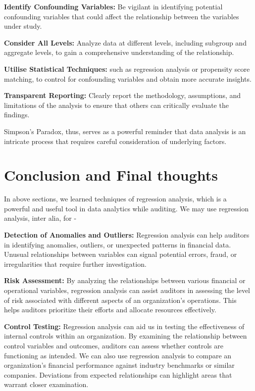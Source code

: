 \documentclass[
]{book}
\begin{document}
\textbf{Identify Confounding Variables:} Be vigilant in identifying potential confounding variables that could affect the relationship between the variables under study.

\textbf{Consider All Levels:} Analyze data at different levels, including subgroup and aggregate levels, to gain a comprehensive understanding of the relationship.

\textbf{Utilise Statistical Techniques:} such as regression analysis or propensity score matching, to control for confounding variables and obtain more accurate insights.

\textbf{Transparent Reporting:} Clearly report the methodology, assumptions, and limitations of the analysis to ensure that others can critically evaluate the findings.

Simpson's Paradox, thus, serves as a powerful reminder that data analysis is an intricate process that requires careful consideration of underlying factors.

\hypertarget{conclusion-and-final-thoughts}{%
\section{Conclusion and Final thoughts}\label{conclusion-and-final-thoughts}}

In above sections, we learned techniques of regression analysis, which is a powerful and useful tool in data analytics while auditing. We may use regression analysis, inter alia, for -

\textbf{Detection of Anomalies and Outliers:} Regression analysis can help auditors in identifying anomalies, outliers, or unexpected patterns in financial data. Unusual relationships between variables can signal potential errors, fraud, or irregularities that require further investigation.

\textbf{Risk Assessment:} By analyzing the relationships between various financial or operational variables, regression analysis can assist auditors in assessing the level of risk associated with different aspects of an organization's operations. This helps auditors prioritize their efforts and allocate resources effectively.

\textbf{Control Testing:} Regression analysis can aid us in testing the effectiveness of internal controls within an organization. By examining the relationship between control variables and outcomes, auditors can assess whether controls are functioning as intended. We can also use regression analysis to compare an organization's financial performance against industry benchmarks or similar companies. Deviations from expected relationships can highlight areas that warrant closer examination.
\end{document}
